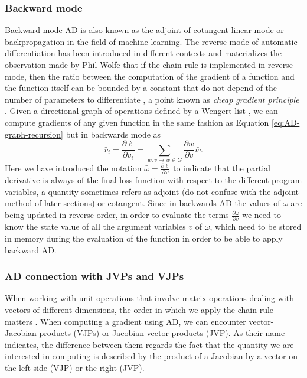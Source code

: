 \subsubsection{Backward mode}

Backward mode AD is also known as the adjoint of cotangent linear mode or backpropagation in the field of machine learning. 
The reverse mode of automatic differentiation has been introduced in different contexts \cite{griewank2012invented} and materializes the observation made by Phil Wolfe that if the chain rule is implemented in reverse mode, then the ratio between the computation of the gradient of a function and the function itself can be bounded by a constant that do not depend of the number of parameters to differentiate \cite{Griewack-on-AD, Wolfe_1982}, a point known as \textit{cheap gradient principle} \cite{griewank2012invented}.  
Given a directional graph of operations defined by a Wengert list \cite{Wengert_1964}, we can compute gradients of any given function in the same fashion as Equation \eqref{eq:AD-graph-recursion} but in backwards mode as
\begin{equation}
 \bar v_i = \frac{\partial \ell}{\partial v_i}= \sum_{w : v \rightarrow w \in G} \frac{\partial w}{\partial v} \bar{w}.
\end{equation}
Here we have introduced the notation $\bar{\omega} = \frac{\partial \ell}{\partial \omega}$ to indicate that the partial derivative is always of the final loss function with respect to the different program variables, a quantity sometimes refers as adjoint (do not confuse with the adjoint method of later sections) or cotangent. 
Since in backwards AD the values of $\bar \omega$ are being updated in reverse order, in order to evaluate the terms $\frac{\partial \omega}{\partial v}$ we need to know the state value of all the argument variables $v$ of $\omega$, which need to be stored in memory during the evaluation of the function in order to be able to apply backward AD.


\subsubsection{AD connection with JVPs and VJPs}

When working with unit operations that involve matrix operations dealing with vectors of different dimensions, the order in which we apply the chain rule matters \cite{Giering_Kaminski_1998}.
When computing a gradient using AD, we can encounter vector-Jacobian products (VJPs) or Jacobian-vector products (JVP).
As their name indicates, the difference between them regards the fact that the quantity we are interested in computing is described by the product of a Jacobian by a vector on the left side (VJP) or the right (JVP).

